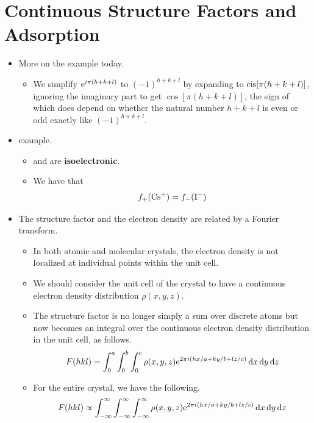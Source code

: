 \documentclass[../notes.tex]{subfiles}
\begin{document}
\section{Continuous Structure Factors and Adsorption}
\begin{itemize}
    \item {}More on the  example today.
    \begin{itemize}
        \item We simplify $\e[i\pi(h+k+l)]$ to $(-1)^{h+k+l}$ by expanding to $\cis[\pi(h+k+l)]$, ignoring the imaginary part to get $\cos[\pi(h+k+l)]$, the sign of which does depend on whether the natural number $h+k+l$ is even or odd exactly like $(-1)^{h+k+l}$.
    \end{itemize}
    \item {} example.
    \begin{itemize}
        \item {} and  are \textbf{isoelectronic}.
        \item We have that
        \begin{equation*}
            f_+(\ce{Cs+}) = f_-(\ce{I-})
        \end{equation*}
    \end{itemize}
    \item The structure factor and the electron density are related by a Fourier transform.
    \begin{itemize}
        \item In both atomic and molecular crystals, the electron density is not localized at individual points within the unit cell.
        \item We should consider the unit cell of the crystal to have a continuous electron density distribution $\rho(x,y,z)$.
        \item The structure factor is no longer simply a sum over discrete atoms but now becomes an integral over the continuous electron density distribution in the unit cell, as follows.
        \begin{equation*}
            F(hkl) = \int_0^a\int_0^b\int_0^c\rho(x,y,z)\e[2\pi i(hx/a+ky/b+lz/c)]\dd{x}\dd{y}\dd{z}
        \end{equation*}
        \item For the entire crystal, we have the following.
        \begin{equation*}
            F(hkl) \propto \int_{-\infty}^\infty\int_{-\infty}^\infty\int_{-\infty}^\infty\rho(x,y,z)\e[2\pi i(hx/a+ky/b+lz/c)]\dd{x}\dd{y}\dd{z}

\end{equation*}
\end{itemize}
\end{itemize}
\end{document}
